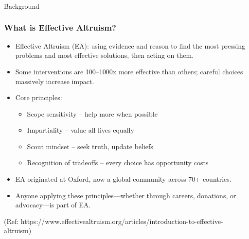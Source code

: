 \begin{frame}[fragile]\frametitle{}
\begin{center}
{\Large Background}
\end{center}
\end{frame}


\begin{frame}[fragile]\frametitle{What is Effective Altruism?}
  \begin{itemize}
    \item Effective Altruism (EA): using evidence and reason to find the most pressing problems and most effective solutions, then acting on them.
    \item Some interventions are 100–1000x more effective than others; careful choices massively increase impact.
    \item Core principles: 
      \begin{itemize}
        \item Scope sensitivity – help more when possible
        \item Impartiality – value all lives equally
        \item Scout mindset – seek truth, update beliefs
        \item Recognition of tradeoffs – every choice has opportunity costs
      \end{itemize}
    \item EA originated at Oxford, now a global community across 70+ countries.
    \item Anyone applying these principles—whether through careers, donations, or advocacy—is part of EA.
  \end{itemize}
  
{\tiny (Ref: https://www.effectivealtruism.org/articles/introduction-to-effective-altruism)}  	  
  
\end{frame}

